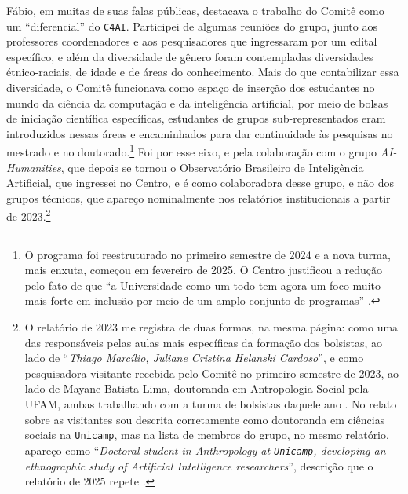 Fábio, em muitas de suas falas públicas, destacava o trabalho do Comitê como um \enquote{diferencial} do \texttt{C4AI}. Participei de algumas reuniões do grupo, junto aos professores coordenadores e aos pesquisadores que ingressaram por um edital específico, e além da diversidade de gênero foram contempladas diversidades étnico-raciais, de idade e de áreas do conhecimento. Mais do que contabilizar essa diversidade, o Comitê funcionava como espaço de inserção dos estudantes no mundo da ciência da computação e da inteligência artificial, por meio de bolsas de iniciação científica específicas, estudantes de grupos sub-representados eram introduzidos nessas áreas e encaminhados para dar continuidade às pesquisas no mestrado e no doutorado.\footnote{O programa foi reestruturado no primeiro semestre de 2024 e a nova turma, mais enxuta, começou em fevereiro de 2025. O Centro justificou a redução pelo fato de que \enquote{a Universidade como um todo tem agora um foco muito mais forte em inclusão por meio de um amplo conjunto de programas} \parencite[tradução minha]{C4AI2025}.} Foi por esse eixo, e pela colaboração com o grupo \textit{AI-Humanities}, que depois se tornou o Observatório Brasileiro de Inteligência Artificial, que ingressei no Centro, e é como colaboradora desse grupo, e não dos grupos técnicos, que apareço nominalmente nos relatórios institucionais a partir de 2023.\footnote{O relatório de 2023 me registra de duas formas, na mesma página: como uma das responsáveis pelas aulas mais específicas da formação dos bolsistas, ao lado de \enquote{\textit{Thiago Marcílio, Juliane Cristina Helanski Cardoso}}, e como pesquisadora visitante recebida pelo Comitê no primeiro semestre de 2023, ao lado de Mayane Batista Lima, doutoranda em Antropologia Social pela UFAM, ambas trabalhando com a turma de bolsistas daquele ano \parencite[p.~27]{C4AI2023}. No relato sobre as visitantes sou descrita corretamente como doutoranda em ciências sociais na \texttt{Unicamp}, mas na lista de membros do grupo, no mesmo relatório, apareço como \enquote{\textit{Doctoral student in Anthropology at \texttt{Unicamp}, developing an ethnographic study of Artificial Intelligence researchers}}, descrição que o relatório de 2025 repete \parencite[p.~27]{C4AI2023, C4AI2025}.}

